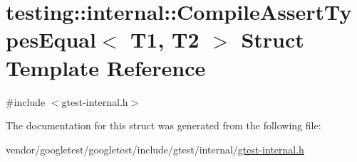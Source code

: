 \hypertarget{structtesting_1_1internal_1_1_compile_assert_types_equal}{}\section{testing\+:\+:internal\+:\+:Compile\+Assert\+Types\+Equal$<$ T1, T2 $>$ Struct Template Reference}
\label{structtesting_1_1internal_1_1_compile_assert_types_equal}


{\ttfamily \#include $<$gtest-\/internal.\+h$>$}



The documentation for this struct was generated from the following file\+:\begin{DoxyCompactItemize}
\item 
vendor/googletest/googletest/include/gtest/internal/\hyperlink{gtest-internal_8h}{gtest-\/internal.\+h}\end{DoxyCompactItemize}
